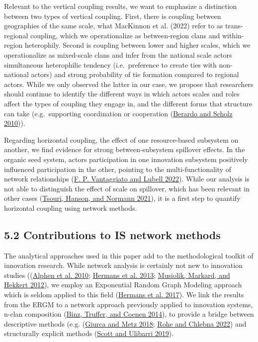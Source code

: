 \documentclass[twoside,12pt,final]{ucthesis-CA2012}
\begin{document}
\begin{ucmainmatter}
Relevant to the vertical coupling results, we want to emphasize a
distinction between two types of vertical coupling. First, there is
coupling between geographies of the same scale, what MacKinnon et al.
(2022) refer to as trans-regional coupling, which we operationalize as
between-region clans and within-region heterophily. Second is coupling
between lower and higher scales, which we operationalize as mixed-scale
clans and infer from the national scale actors\textquotesingle{} simultaneous
heterophilic tendency (i.e.~preference to create ties with non-national
actors) and strong probability of tie formation compared to regional
actors. While we only observed the latter in our case, we propose that
researchers should continue to identify the different ways in which
actors\textquotesingle{} scales and roles affect the types of coupling they engage in,
and the different forms that structure can take (e.g.~supporting
coordination or cooperation
(\protect\hyperlink{ref-Berardo_Scholz_2010}{Berardo and Scholz 2010})).

Regarding horizontal coupling, the effect of one resource-based
subsystem on another, we find evidence for strong between-subsystem
spillover effects. In the organic seed system, actors\textquotesingle{} participation in
one innovation subsystem positively influenced participation in the
other, pointing to the multi-functionality of network relationships
(\protect\hyperlink{ref-Vantaggiato_Lubell_2022}{F. P. Vantaggiato and Lubell 2022}).
While our analysis is not able to distinguish the effect of scale on
spillover, which has been relevant in other cases
(\protect\hyperlink{ref-Tsouri_Hanson_Normann_2021}{Tsouri, Hanson, and Normann 2021}),
it is a first step to quantify horizontal coupling using network
methods.

\hypertarget{contributions-to-is-network-methods}{%
\subsection{5.2 Contributions to IS network methods}\label{contributions-to-is-network-methods}}

The analytical approaches used in this paper add to the methodological
toolkit of innovation research. While network analysis is certainly not
new to innovation studies ((\protect\hyperlink{ref-van_Alphen_Noothout_Hekkert_Turkenburg_2010}{Alphen et al. 2010}; \protect\hyperlink{ref-Hermans_Stuiver_Beers_Kok_2013}{Hermans et al. 2013}; \protect\hyperlink{ref-Musiolik_Markard_Hekkert_2012}{Musiolik, Markard, and Hekkert 2012}),
we employ an Exponential Random Graph Modeling approach which is seldom
applied to this field (\protect\hyperlink{ref-Hermans_Sartas_Van_Schagen_Van_Asten_Schut_2017}{Hermans et al. 2017}). We link
the results from the ERGM to a network approach previously applied to
innovation systems, n-clan composition
(\protect\hyperlink{ref-Binz_Truffer_Coenen_2014}{Binz, Truffer, and Coenen 2014}),
to provide a bridge between descriptive methods (e.g.
(\protect\hyperlink{ref-Giurca_Metz_2018}{Giurca and Metz 2018}; \protect\hyperlink{ref-Rohe_Chlebna_2022}{Rohe and Chlebna 2022})
and structurally explicit methods
(\protect\hyperlink{ref-Scott_Ulibarri_2019}{Scott and Ulibarri 2019}).


\end{ucmainmatter}
\end{document}
